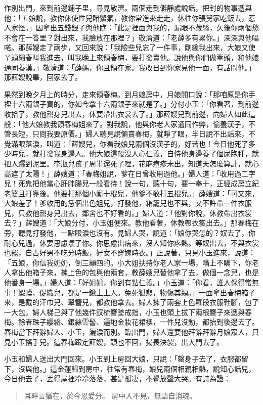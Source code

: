 作別出門，來到前邊鋪子里，尋見敬濟。兩個走到僻靜處說話，把封的物事遞與他：「五娘說，教你休使性兒賭鱉氣，教你常進來走走，休往你張舅家吃飯去，惹人家怪。」因拿出五錢銀子與他瞧：「此是裡面與我的，漏眼不藏絲，久後你兩個愁不會在一答里？對出來，我臉放在那裡？」敬濟道：「老薛多有累你。」深深與他唱喏。那薛嫂走了兩步，又回來說：「我險些兒忘了一件事，剛纔我出來，大娘又使丫頭繡春叫我進去，叫我晚上來領春梅，要打發賣他。說他與你們做牽頭，和他娘通同養漢。」敬濟道：「薛媽，你且領在家。我改日到你家見他一面，有話問他。」那薛嫂說畢，回家去了。

果然到晚夕月上的時分，走來領春梅。到月娘房中，月娘開口說：「那咱原是你手裡十六兩銀子買的，你如今拿十六兩銀子來就是了。」分付小玉：「你看著，到前邊收拾了，教他罄身兒出去，休要帶出衣裳去了。」那薛嫂兒到前邊，向婦人如此這般：「他大娘教我領春梅姐來了。對我說，他與你老人家通同作弊，偷養漢子，不管長短，只問我要原價。」婦人聽見說領賣春梅，就睜了眼，半日說不出話來，不覺滿眼落淚，叫道：「薛嫂兒，你看我娘兒兩個沒漢子的，好苦也！今日他死了多少時兒，就打發我身邊人。他大娘這般沒人心仁義，自恃他身邊養了個尿胞種，就把人躧到泥里。李瓶兒孩子周半還死了哩，花麻痘疹未出，知道天怎麼算計，就心高遮了太陽！」薛嫂道：「春梅姐說，爹在日曾收用過他。」婦人道：「收用過二字兒！死鬼把他當心肝肺腸兒一般看待！說一句，聽十句，要一奉十，正經成房立紀老婆且打靠後。他要打那個小廝十棍兒，他爹不敢打五棍兒。」薛嫂道：「可又來，大娘差了！爹收用的恁個出色姐兒，打發他，箱籠兒也不與，又不許帶一件衣服兒，只教他罄身兒出去，鄰舍也不好看的。」婦人道：「他對你說，休教帶出衣裳去？」薛嫂道：「大娘分付，小玉姐便來。教他看著，休教帶衣裳出去。」那春梅在旁，聽見打發他，一點眼淚也沒有。見婦人哭，說道：「娘你哭怎的？奴去了，你耐心兒過，休要思慮壞了你。你思慮出病來，沒人知你疼熱。等奴出去，不與衣裳也罷，自古好男不吃分時飯，好女不穿嫁時衣。」正說著，只見小玉進來，說道：「五娘，你信我奶奶，倒三顛四的。小大姐扶持你老人家一場，瞞上不瞞下，你老人拿出他箱子來，揀上色的包與他兩套，教薛嫂兒替他拿了去，做個一念兒，也是他番身一場。」婦人道：「好姐姐，你到有點仁義。」小玉道：「你看，誰人保得常無事！蝦蟆、促織兒，都是一鍬土上人。兔死狐悲，物傷其類。」一面拿出春梅箱子來，是戴的汗巾兒、翠簪兒，都教他拿去。婦人揀了兩套上色羅段衣服鞋腳，包了一大包，婦人梯己與了他幾件釵梳簪墜戒指，小玉也頭上拔下兩根簪子來遞與春梅。餘者珠子纓絡、銀絲雲髻、遍地金妝花裙襖，一件兒沒動，都抬到後邊去了。春梅當下拜辭婦人、小玉，灑淚而別。臨出門，婦人還要他拜辭拜辭月娘眾人，只見小玉搖手兒。這春梅跟定薛嫂，頭也不回，揚長決裂，出大門去了。

小玉和婦人送出大門回來。小玉到上房回大娘，只說：「罄身子去了，衣服都留下，沒與他。」這金蓮歸到房中，往常有春梅，娘兒兩個相親相熱，說知心話兒，今日他去了，丟得屋裡冷冷落落，甚是孤凄，不覺放聲大哭。有詩為證：
\begin{quote}
耳畔言猶在，於今恩愛分。
房中人不見，無語自消魂。
\end{quote}
